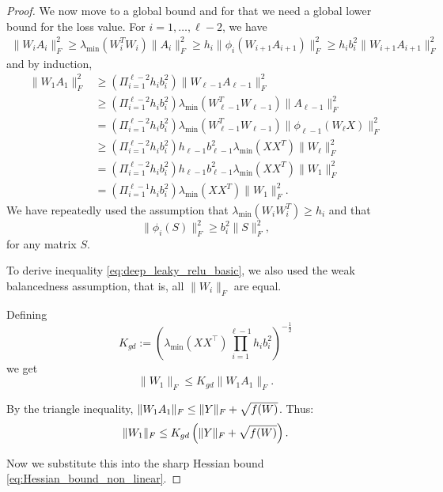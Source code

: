\documentclass[10pt,a4paper]{amsart}
\DeclarePairedDelimiter{\norm}{\|}{\|}
\begin{document}
\begin{proof}
We now move to a global bound and for that we need a global lower bound for the loss value. For $i=1 ,\dots, \ell-2$, we have
\begin{align*}
     \|W_i A_i\|_F^2 \geq \lambda_{\min}(W_i^T W_i) \|A_i\|_F^2 \geq h_i \|\phi_i(W_{i+1} A_{i+1})\|^2_F \geq h_i b_i^2 \|W_{i+1} A_{i+1}\|_F^2
\end{align*}
and by induction,
\begin{align}
\label{eq:deep_leaky_relu_basic}
    \|W_1 A_1\|_F^2 & \geq \nonumber\left(\Pi_{i=1}^{\ell-2} h_i b_i^2 \right) \|W_{\ell-1} A_{\ell-1}\|_F^2 \\ & \geq \nonumber\left(\Pi_{i=1}^{\ell-2} h_i b_i^2 \right) \lambda_{\min}(W_{\ell-1}^T W_{\ell-1}) \|A_{\ell-1}\|_F^2 \\ & = \nonumber \left(\Pi_{i=1}^{\ell-2} h_i b_i^2 \right) \lambda_{\min}(W_{\ell-1}^T W_{\ell-1}) \|\phi_{\ell-1}(W_{\ell} X)\|_F^2 \\ & \geq \nonumber \left(\Pi_{i=1}^{\ell-2} h_i b_i^2 \right) h_{\ell-1} b_{\ell-1}^2 \lambda_{\min}(X X^T) \|W_{\ell}\|_F^2 \\ & = \nonumber\left(\Pi_{i=1}^{\ell-2} h_i b_i^2 \right) h_{\ell-1} b_{\ell-1}^2 \lambda_{\min}(X X^T) \|W_1\|_F^2 \\ & = \left(\Pi_{i=1}^{\ell-1} h_i b_i^2 \right) \lambda_{\min}(X X^T) \|W_1\|_F^2.
\end{align}
We have repeatedly used the assumption that $\lambda_{\min}(W_i W_i^T) \geq h_i$ and that
\begin{equation*}
    \|\phi_i(S)\|^2_F \geq b_i^2 \|S\|_F^2,
\end{equation*}
for any matrix $S$.

To derive inequality \eqref{eq:deep_leaky_relu_basic}, we also used the weak balancedness assumption, that is, all $\|W_i\|_F$ are equal.

Defining \begin{equation}
\label{eq:K_gd_def}
K_{gd} := \left( \lambda_{\min}(XX^\top) \prod_{i=1}^{\ell-1} h_i b_i^2 \right)^{-\frac{1}{2}}
\end{equation}
we get
$$ \|W_1\|_F \leq K_{gd} \|W_1 A_1\|_F. $$

By the triangle inequality, $\norm{W_1 A_1}_F \le \norm{Y}_F + \sqrt{f(W)}$. Thus:
\begin{equation}
\label{eq:W1_bound_nonlinear}
\norm{W_1}_F \le K_{gd} \left( \norm{Y}_F + \sqrt{f(W)} \right).
\end{equation}

Now we substitute this into the sharp Hessian bound \eqref{eq:Hessian_bound_non_linear}.

\end{proof}
\end{document}
